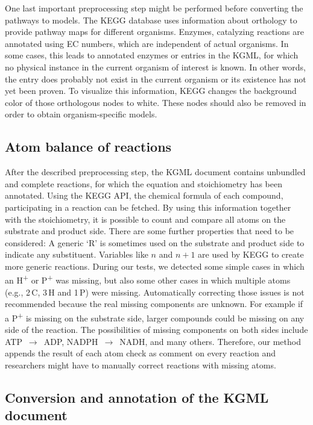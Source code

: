 \documentclass[10pt]{bmc_article}
\newenvironment{bmcformat}{\baselineskip20pt\sloppy\setboolean{publ}{false}}{\baselineskip20pt\sloppy}
\def\plus{\textsuperscript{+}}
\begin{document}
\begin{bmcformat}
One last important preprocessing step might be performed before converting the pathways to models.
The KEGG database uses information about orthology to provide pathway maps for different organisms. Enzymes, catalyzing reactions are annotated using EC numbers, which are independent of actual organisms. In some cases, this leads to annotated enzymes or entries in the KGML, for which no physical instance in the current organism of interest is known. In other words, the entry does probably not exist in the current organism or its existence has not yet been proven. To visualize this information, KEGG changes the background color of those orthologous nodes to white. These nodes should also be removed in order to obtain organism-specific models.

\subsection*{Atom balance of reactions}

After the described preprocessing step, the KGML document contains unbundled and complete reactions, for which the equation and stoichiometry has been annotated. Using the KEGG API, the chemical formula of each compound, participating in a reaction can be fetched. By using this information together with the stoichiometry, it is possible to count and compare all atoms on the substrate and product side. There are some further properties that need to be considered: A generic `R' is sometimes used on the substrate and product side to indicate any substituent. Variables like $n$ and $n+1$ are used by KEGG to create more generic reactions. During our tests, we detected some simple cases in which an H\plus{} or P\plus{} was missing, but also some other cases in which multiple atoms (e.g., 2\,C, 3\,H and 1\,P) were missing. Automatically correcting those issues is not recommended because the real missing components are unknown.
%
For example if a P\plus{} is missing on the substrate side, larger compounds could be missing on any side of the reaction. The possibilities of missing components on both sides include ATP~$\longrightarrow$~ADP, NADPH~$\longrightarrow$~NADH, and many others.
Therefore, our method appends the result of each atom check as comment on every reaction and researchers might have to manually correct reactions with missing atoms.


\subsection*{Conversion and annotation of the KGML document}



\end{bmcformat}
\end{document}
